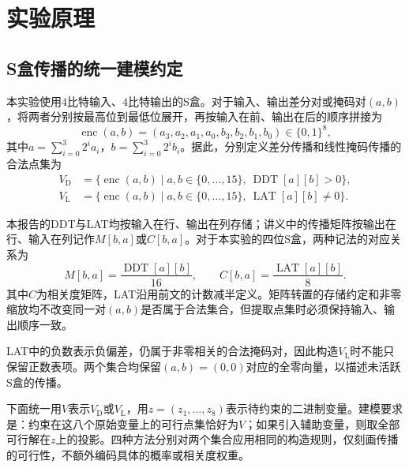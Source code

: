 \section{实验原理}




\subsection{S盒传播的统一建模约定}
\label{subsec:lab4-modeling-conventions}

本实验使用$4$比特输入、$4$比特输出的S盒。对于输入、输出差分对或掩码对$(a,b)$，将两者分别按最高位到最低位展开，再按输入在前、输出在后的顺序拼接为
\[
\operatorname{enc}(a,b)
=(a_3,a_2,a_1,a_0,b_3,b_2,b_1,b_0)\in\{0,1\}^{8},
\]
其中$a=\sum_{i=0}^{3}2^i a_i$，$b=\sum_{i=0}^{3}2^i b_i$。据此，分别定义差分传播和线性掩码传播的合法点集为
\begin{align*}
V_{\mathrm D}
&=\{\operatorname{enc}(a,b)\mid
  a,b\in\{0,\ldots,15\},\ \operatorname{DDT}[a][b]>0\},\\
V_{\mathrm L}
&=\{\operatorname{enc}(a,b)\mid
  a,b\in\{0,\ldots,15\},\ \operatorname{LAT}[a][b]\ne0\}.
\end{align*}

本报告的DDT与LAT均按输入在行、输出在列存储；讲义中的传播矩阵按输出在行、输入在列记作$M[b,a]$或$C[b,a]$。对于本实验的四位S盒，两种记法的对应关系为
\[
M[b,a]=\frac{\operatorname{DDT}[a][b]}{16},
\qquad
C[b,a]=\frac{\operatorname{LAT}[a][b]}{8}.
\]
其中$C$为相关度矩阵，LAT沿用前文的计数减半定义。矩阵转置的存储约定和非零缩放均不改变同一对$(a,b)$是否属于合法集合，但提取点集时必须保持输入、输出顺序一致。

LAT中的负数表示负偏差，仍属于非零相关的合法掩码对，因此构造$V_{\mathrm L}$时不能只保留正数表项。两个集合均保留$(a,b)=(0,0)$对应的全零向量，以描述未活跃S盒的传播。

下面统一用$V$表示$V_{\mathrm D}$或$V_{\mathrm L}$，用$z=(z_1,\ldots,z_8)$表示待约束的二进制变量。建模要求是：约束在这八个原始变量上的可行点集恰好为$V$；如果引入辅助变量，则取全部可行解在$z$上的投影。四种方法分别对两个集合应用相同的构造规则，仅刻画传播的可行性，不额外编码具体的概率或相关度权重。

